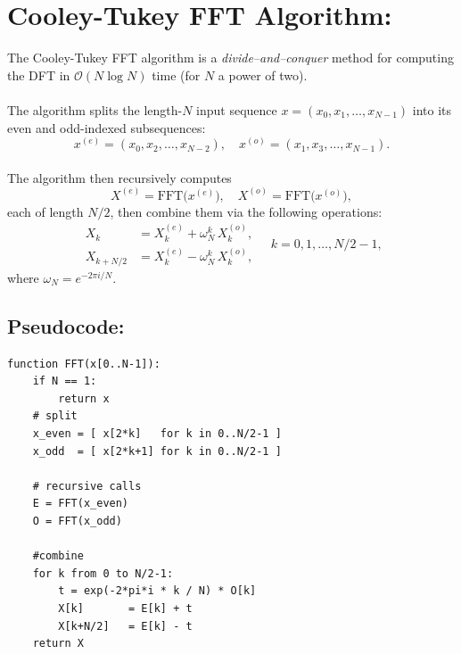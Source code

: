 \documentclass[12pt]{article}
\begin{document}
\section{Cooley-Tukey FFT Algorithm:}
The Cooley-Tukey FFT algorithm is a \emph{divide–and–conquer} method for computing the DFT in $\mathcal{O}(N\log N)$ time (for \(N\) a power of two).  
\\
\\
The algorithm splits the length-\(N\) input sequence \(x = (x_0,x_1,\dots,x_{N-1})\) into its even and odd-indexed subsequences:
\[
x^{(e)} = (x_0, x_2, \dots, x_{N-2}), 
\quad
x^{(o)} = (x_1, x_3, \dots, x_{N-1}).
\]
\\
\noindent The algorithm then recursively computes
\[
X^{(e)} = \mathrm{FFT}\bigl(x^{(e)}\bigr), 
\quad
X^{(o)} = \mathrm{FFT}\bigl(x^{(o)}\bigr),
\]
\noindent each of length \(N/2\), then combine them via the following operations:
\[
\begin{aligned}
X_k &= X^{(e)}_k + \omega_N^k\,X^{(o)}_k,\\
X_{k+N/2} &= X^{(e)}_k - \omega_N^k\,X^{(o)}_k,
\end{aligned}
\quad k = 0,1,\dots,N/2-1,
\]
\noindent where \(\omega_N = e^{-2\pi i /N}\).

\subsection{Pseudocode:}
\begin{verbatim}
function FFT(x[0..N-1]):
    if N == 1:
        return x
    # split
    x_even = [ x[2*k]   for k in 0..N/2-1 ]
    x_odd  = [ x[2*k+1] for k in 0..N/2-1 ]
    
    # recursive calls
    E = FFT(x_even)
    O = FFT(x_odd)
    
    #combine
    for k from 0 to N/2-1:
        t = exp(-2*pi*i * k / N) * O[k]
        X[k]       = E[k] + t
        X[k+N/2]   = E[k] - t
    return X
\end{verbatim}
\end{document}
